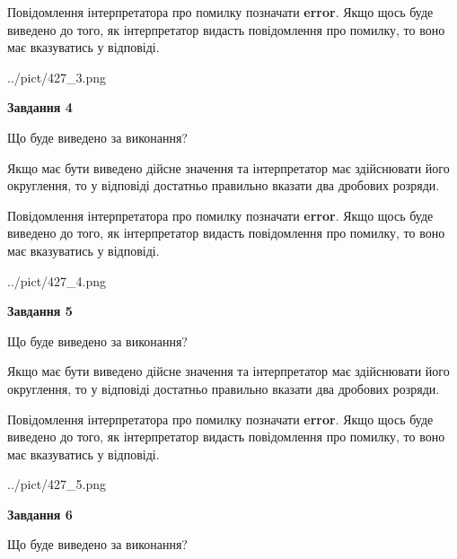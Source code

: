 \documentclass[12pt, ukrainian]{article}
\begin{document}
{\begin {Large}
Повідомлення інтерпретатора про помилку позначати \textbf{error}.
Якщо щось буде виведено до того, як інтерпретатор видасть повідомлення про помилку, 
то воно має вказуватись у відповіді. \par

\begin{center}
	{../pict/427_3.png}
\end{center}
\newpage

{\begin {center}\textbf{Завдання 4}\end {center}}\par
Що буде виведено за виконання? \par

Якщо має бути виведено дійсне значення та інтерпретатор має здійснювати його округлення, 
то у відповіді достатньо правильно вказати два дробових розряди.

Повідомлення інтерпретатора про помилку позначати \textbf{error}.
Якщо щось буде виведено до того, як інтерпретатор видасть повідомлення про помилку, 
то воно має вказуватись у відповіді. \par

\begin{center}
	{../pict/427_4.png}
\end{center}
\newpage

{\begin {center}\textbf{Завдання 5}\end {center}}\par
Що буде виведено за виконання? \par

Якщо має бути виведено дійсне значення та інтерпретатор має здійснювати його округлення, 
то у відповіді достатньо правильно вказати два дробових розряди.

Повідомлення інтерпретатора про помилку позначати \textbf{error}.
Якщо щось буде виведено до того, як інтерпретатор видасть повідомлення про помилку, 
то воно має вказуватись у відповіді. \par

\begin{center}
	{../pict/427_5.png}
\end{center}
\newpage

{\begin {center}\textbf{Завдання 6}\end {center}}\par
Що буде виведено за виконання? \par


\end{Large}}
\end{document}
